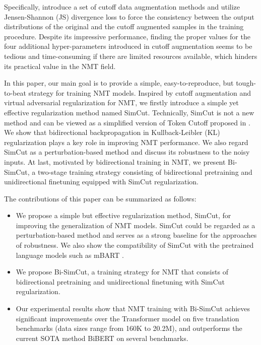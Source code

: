 \documentclass[11pt]{article}
\begin{document}
Specifically, \citet{shen2020simple} introduce a set of cutoff data augmentation methods and utilize Jensen-Shannon (JS) divergence loss to force the consistency between the output distributions of the original and the cutoff augmented samples in the training procedure. Despite its impressive performance, finding the proper values for the four additional hyper-parameters introduced in cutoff augmentation seems to be tedious and time-consuming if there are limited resources available, which hinders its practical value in the NMT field. 

In this paper, our main goal is to provide a simple, easy-to-reproduce, but tough-to-beat strategy for training NMT models. Inspired by cutoff augmentation \cite{shen2020simple} and virtual adversarial regularization \cite{sano2019effective} for NMT, we firstly introduce a simple yet effective regularization method named SimCut. Technically, SimCut is not a new method and can be viewed as a simplified version of Token Cutoff proposed in \citet{shen2020simple}. We show that bidirectional backpropagation in Kullback-Leibler (KL) regularization plays a key role in improving NMT performance. We also regard SimCut as a perturbation-based method and discuss its robustness to the noisy inputs. At last, motivated by bidirectional training \cite{ding2021improving} in NMT, we present Bi-SimCut, a two-stage training strategy consisting of bidirectional pretraining and unidirectional finetuning equipped with SimCut regularization.

The contributions of this paper can be summarized as follows:
\begin{itemize}
\item We propose a simple but effective regularization method, SimCut, for improving the generalization of NMT models. SimCut could be regarded as a perturbation-based method and serves as a strong baseline for the approaches of robustness. We also show the compatibility of SimCut with the pretrained language models such as mBART \cite{liu2020multilingual}.

\item We propose Bi-SimCut, a training strategy for NMT that consists of bidirectional pretraining and unidirectional finetuning with SimCut regularization.

\item Our experimental results show that NMT training with Bi-SimCut achieves significant improvements over the Transformer model on five translation benchmarks (data sizes range from 160K to 20.2M), and outperforms the current SOTA method BiBERT \cite{xu-etal-2021-bert} on several benchmarks.
\end{itemize}
\end{document}
